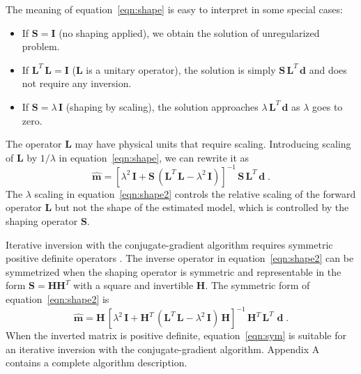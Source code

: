 The meaning of equation~\ref{eqn:shape} is easy to
interpret in some special cases:
\begin{itemize}
\item If $\mathbf{S = I}$ (no shaping applied), we obtain the solution of
  unregularized problem.
\item If $\mathbf{L}^T\,\mathbf{L} = \mathbf{I}$ ($\mathbf{L}$ is a unitary operator),
  the solution is simply $\mathbf{S}\,\mathbf{L}^T\,\mathbf{d}$ and does not require
  any inversion.
\item If $\mathbf{S} = \lambda\,\mathbf{I}$ (shaping by scaling), the
  solution approaches $\lambda\,\mathbf{L}^T\,\mathbf{d}$ as $\lambda$ goes to
  zero.
\end{itemize}

The operator $\mathbf{L}$ may have physical units that require
scaling. Introducing scaling of $\mathbf{L}$ by $1/\lambda$ in
equation~\ref{eqn:shape}, we can rewrite it as
\begin{equation}
  \widehat{\mathbf{m}} = 
 \left[\lambda^2\,\mathbf{I} + 
    \mathbf{S}\,\left(\mathbf{L}^T\,\mathbf{L} - \lambda^2\,\mathbf{I}\right)
  \right]^{-1}\,
  \mathbf{S}\,\mathbf{L}^T\,\mathbf{d}\;.
  \label{eqn:shape2}  
\end{equation}
The $\lambda$ scaling in equation~\ref{eqn:shape2}
controls the relative scaling of the forward operator $\mathbf{L}$ but
not the shape of the estimated model, which is controlled by the
shaping operator $\mathbf{S}$.

Iterative inversion with the conjugate-gradient algorithm requires
symmetric positive definite operators \cite[]{hestenes}. The inverse
operator in equation~\ref{eqn:shape2} can be symmetrized when the
shaping operator is symmetric and representable in the form $\mathbf S
= \mathbf{H H}^T$ with a square and invertible $\mathbf{H}$. The
symmetric form of equation~\ref{eqn:shape2} is
\begin{equation}
  \widehat{\mathbf{m}} = 
  \mathbf{H}\,\left[\lambda^2\,\mathbf{I} + 
    \mathbf{H}^T\,\left(\mathbf{L}^T\,\mathbf{L} - 
      \lambda^2\,\mathbf{I}\right)\,
    \mathbf{H}\right]^{-1}\,
  \mathbf{H}^T\,\mathbf{L}^T\,\,\mathbf{d}\;.
  \label{eqn:sym}  
\end{equation}
When the inverted matrix
is positive definite, equation~\ref{eqn:sym} is suitable for an
iterative inversion with the conjugate-gradient algorithm. Appendix A
contains a complete algorithm description.

